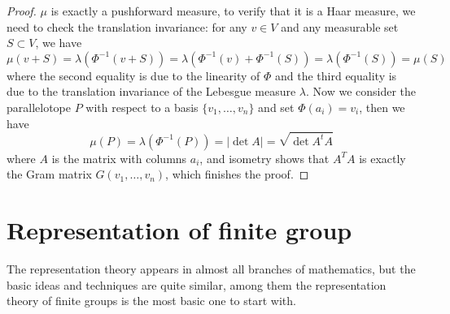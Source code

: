 \begin{proof}
    \(\mu\) is exactly a pushforward measure, to verify that it is a Haar measure, we need to check the translation invariance: for any \(v \in V\) and any measurable set \(S \subset V\), we have
    \[\mu(v+S) = \lambda(\Phi^{-1}(v+S)) = \lambda(\Phi^{-1}(v) + \Phi^{-1}(S)) = \lambda(\Phi^{-1}(S)) = \mu(S)\]
    where the second equality is due to the linearity of \(\Phi\) and the third equality is due to the translation invariance of the Lebesgue measure \(\lambda\). Now we consider the parallelotope \(P\) with respect to a basis \(\{v_1,\dots,v_n\}\) and set \(\Phi(a_i) = v_i\), then we have
    \[\mu(P) = \lambda (\Phi^{-1}(P)) = |\det A| = \sqrt{\det A^tA}\]
    where \(A\) is the matrix with columns \(a_i\), and isometry shows that \(A^TA\) is exactly the Gram matrix \(G(v_1,\dots,v_n)\), which finishes the proof.
\end{proof}



\newpage

\section{Representation of finite group}

The representation theory appears in almost all branches of mathematics, but the basic ideas and techniques are quite similar, among them the representation theory of finite groups is the most basic one to start with.

